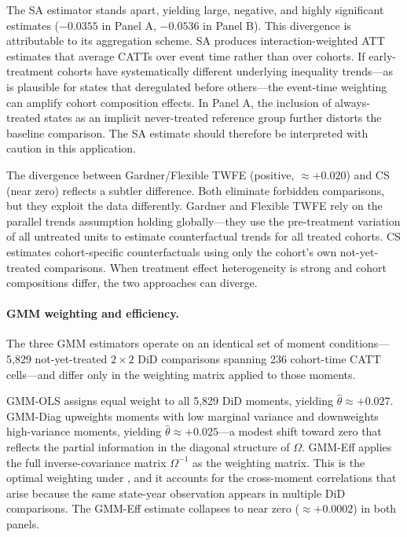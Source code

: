 The SA estimator stands apart, yielding large, negative, and highly
significant estimates ($-0.0355$ in Panel A, $-0.0536$ in Panel B). This
divergence is attributable to its aggregation scheme. SA produces
interaction-weighted ATT estimates that average CATTs over event time
rather than over cohorts. If early-treatment cohorts have systematically
different underlying inequality trends---as is plausible for states that
deregulated before others---the event-time weighting can amplify cohort
composition effects. In Panel A, the inclusion of always-treated states
as an implicit never-treated reference group further distorts the baseline
comparison. The SA estimate should therefore be interpreted with caution
in this application.

The divergence between Gardner/Flexible TWFE (positive, $\approx+0.020$)
and CS (near zero) reflects a subtler difference. Both eliminate
forbidden comparisons, but they exploit the data differently. Gardner
and Flexible TWFE rely on the parallel trends assumption holding
globally---they use the pre-treatment variation of all untreated units to
estimate counterfactual trends for all treated cohorts. CS estimates
cohort-specific counterfactuals using only the cohort's own not-yet-treated
comparisons. When treatment effect heterogeneity is strong and cohort
compositions differ, the two approaches can diverge.

\paragraph{GMM weighting and efficiency.}
The three GMM estimators operate on an identical set of moment
conditions---5{,}829 not-yet-treated $2\times 2$ DiD comparisons spanning
236 cohort-time CATT cells---and differ only in the weighting matrix
applied to those moments.

GMM-OLS assigns equal weight to all 5{,}829 DiD moments, yielding
$\hat{\theta} \approx +0.027$. GMM-Diag upweights moments with low
marginal variance and downweights high-variance moments, yielding
$\hat{\theta} \approx +0.025$---a modest shift toward zero that reflects
the partial information in the diagonal structure of $\Omega$.
GMM-Eff applies the full inverse-covariance matrix $\Omega^{-1}$ as the
weighting matrix. This is the optimal weighting under
\citet{hansen1982}, and it accounts for the cross-moment correlations that
arise because the same state-year observation appears in multiple DiD
comparisons. The GMM-Eff estimate collapses to near zero
($\approx+0.0002$) in both panels.

